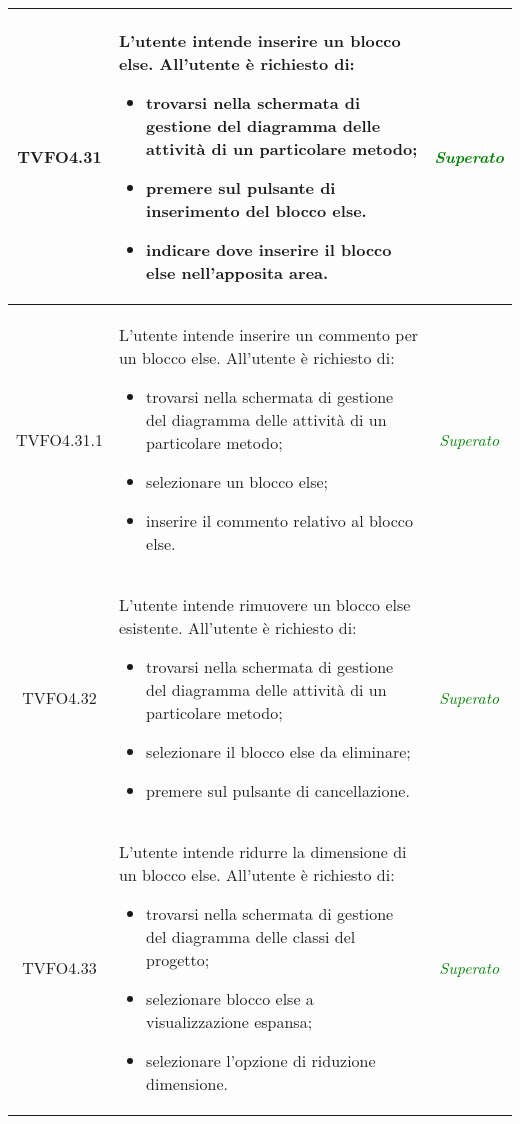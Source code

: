 \begin{longtable}{|c|>{}m{8cm}|c|}
\hypertarget{TVFO4.31}{TVFO4.31} & L'utente intende inserire un blocco else.
All'utente è richiesto di:
\begin{itemize}
	\item trovarsi nella schermata di gestione del diagramma delle attività di un particolare metodo;
	\item premere sul pulsante di inserimento del blocco else.
	\item indicare dove inserire il blocco else nell'apposita area.
\end{itemize} & \textcolor{Green}{\textit{Superato}}\\ \hline

\hypertarget{TVFO4.31.1}{TVFO4.31.1} & L'utente intende inserire un commento per un blocco else.
All'utente è richiesto di:
\begin{itemize}
	\item trovarsi nella schermata di gestione del diagramma delle attività di un particolare metodo;
	\item selezionare un blocco else;
	\item inserire il commento relativo al blocco else.
\end{itemize} & \textcolor{Green}{\textit{Superato}}\\ \hline

\hypertarget{TVFO4.32}{TVFO4.32} & L'utente intende rimuovere un blocco else esistente.
All'utente è richiesto di:
\begin{itemize}
	\item trovarsi nella schermata di gestione del diagramma delle attività di un particolare metodo;
	\item selezionare il blocco else da eliminare;
	\item premere sul pulsante di cancellazione.
\end{itemize} & \textcolor{Green}{\textit{Superato}}\\ \hline

\hypertarget{TVFO4.33}{TVFO4.33} & L'utente intende ridurre la dimensione di un blocco else.
All'utente è richiesto di:
\begin{itemize}
	\item trovarsi nella schermata di gestione del diagramma delle classi del progetto;
	\item selezionare blocco else a visualizzazione espansa;
	\item selezionare l'opzione di riduzione dimensione.
\end{itemize} & \textcolor{Green}{\textit{Superato}}\\ \hline


\end{longtable}

